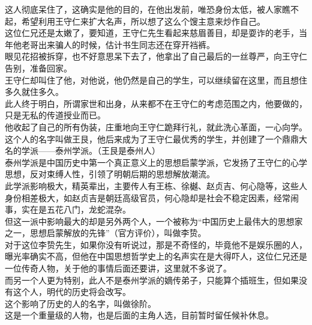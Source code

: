 \begin{multicols}{\theparacolNo}
这人彻底呆住了，这确实是他的目的，在他出发前，唯恐身份太低，被人家瞧不起，希望利用王守仁来扩大名声，所以想了这么个馊主意来炒作自己。\\

这位仁兄还是太嫩了，要知道，王守仁先生看起来慈眉善目，却是耍诈的老手，当年他老哥出来骗人的时候，估计书生同志还在穿开裆裤。\\

眼见花招被拆穿，也不好意思呆下去了，他拿出了自己最后的一丝尊严，向王守仁告别，准备回家。\\

王守仁却叫住了他，对他说，他仍然是自己的学生，可以继续留在这里，而且想住多久就住多久。\\

此人终于明白，所谓家世和出身，从来都不在王守仁的考虑范围之内，他要做的，只是无私的传道授业而已。\\

他收起了自己的所有伪装，庄重地向王守仁跪拜行礼，就此洗心革面，一心向学。\\

这个人的名字叫做王艮，他后来成为了王守仁最优秀的学生，并创建了一个鼎鼎大名的学派——泰州学派。（王艮是泰州人）\\

泰州学派是中国历史中第一个真正意义上的思想启蒙学派，它发扬了王守仁的心学思想，反对束缚人性，引领了明朝后期的思想解放潮流。\\

此学派影响极大，精英辈出，主要传人有王栋、徐樾、赵贞吉、何心隐等，这些人身份相差极大，如赵贞吉是朝廷高级官员，何心隐却是社会不稳定因素，经常闹事，实在是五花八门，龙蛇混杂。\\

但这一派中影响最大的却是另外两个人，一个被称为“中国历史上最伟大的思想家之一，思想启蒙解放的先锋”（官方评价），叫做李贽。\\

对于这位李贽先生，如果你没有听说过，那是不奇怪的，毕竟他不是娱乐圈的人，曝光率确实不高，但他在中国思想哲学史上的名声实在是大得吓人，这位仁兄还是一位传奇人物，关于他的事情后面还要讲，这里就不多说了。\\

而另一个人更为特别，此人不是泰州学派的嫡传弟子，只能算个插班生，但如果没有这个人，明代的历史将会改写。\\

这个影响了历史的人的名字，叫做徐阶。\\

这是一个重量级的人物，也是后面的主角人选，目前暂时留任候补休息。\\


\end{multicols}
